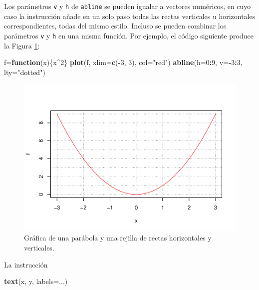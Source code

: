 \documentclass[
]{book}
\newenvironment{Shaded}{\begin{snugshade}}{\end{snugshade}}
\newcommand{\ControlFlowTok}[1]{\textcolor[rgb]{0.13,0.29,0.53}{\textbf{#1}}}
\newcommand{\DataTypeTok}[1]{\textcolor[rgb]{0.13,0.29,0.53}{#1}}
\newcommand{\DecValTok}[1]{\textcolor[rgb]{0.00,0.00,0.81}{#1}}
\newcommand{\KeywordTok}[1]{\textcolor[rgb]{0.13,0.29,0.53}{\textbf{#1}}}
\newcommand{\NormalTok}[1]{#1}
\newcommand{\OperatorTok}[1]{\textcolor[rgb]{0.81,0.36,0.00}{\textbf{#1}}}
\newcommand{\StringTok}[1]{\textcolor[rgb]{0.31,0.60,0.02}{#1}}
\theoremstyle{definition}
\theoremstyle{definition}
\theoremstyle{definition}
\theoremstyle{remark}
\begin{document}
Los parámetros \texttt{v} y \texttt{h} de \texttt{abline} se pueden igualar a vectores numéricos, en cuyo caso la instrucción añade en un solo paso todas las rectas verticales u horizontales correspondientes, todas del mismo estilo. Incluso se pueden combinar los parámetros \texttt{v} y \texttt{h} en una misma función. Por ejemplo, el código siguiente produce la Figura \ref{fig:multivh}:

\begin{Shaded}
\begin{Highlighting}[]
\NormalTok{f=}\ControlFlowTok{function}\NormalTok{(x)\{x}\OperatorTok{\^{}}\DecValTok{2}\NormalTok{\}}
\KeywordTok{plot}\NormalTok{(f, }\DataTypeTok{xlim=}\KeywordTok{c}\NormalTok{(}\OperatorTok{{-}}\DecValTok{3}\NormalTok{, }\DecValTok{3}\NormalTok{), }\DataTypeTok{col=}\StringTok{"red"}\NormalTok{)}
\KeywordTok{abline}\NormalTok{(}\DataTypeTok{h=}\DecValTok{0}\OperatorTok{:}\DecValTok{9}\NormalTok{, }\DataTypeTok{v=}\OperatorTok{{-}}\DecValTok{3}\OperatorTok{:}\DecValTok{3}\NormalTok{, }\DataTypeTok{lty=}\StringTok{"dotted"}\NormalTok{)}
\end{Highlighting}
\end{Shaded}

\begin{figure}

{\centering \includegraphics[width=0.9\linewidth]{07chap06_Graficos_I_files/figure-latex/multivh-1} 

}

\caption{Gráfica de una parábola y una rejilla de rectas horizontales y verticales.}\label{fig:multivh}
\end{figure}

La instrucción

\begin{Shaded}
\begin{Highlighting}[]
\KeywordTok{text}\NormalTok{(x, y, }\DataTypeTok{labels=}\NormalTok{...)}
\end{Highlighting}
\end{Shaded}
\end{document}

